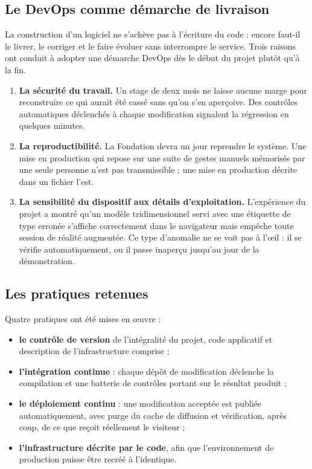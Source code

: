 \subsection{Le DevOps comme démarche de livraison}

La construction d'un logiciel ne s'achève pas à l'écriture du code : encore
faut-il le livrer, le corriger et le faire évoluer sans interrompre le service.
Trois raisons ont conduit à adopter une démarche DevOps dès le début du projet
plutôt qu'à la fin.

\begin{enumerate}
  \item \textbf{La sécurité du travail.} Un stage de deux mois ne laisse aucune
        marge pour reconstruire ce qui aurait été cassé sans qu'on s'en
        aperçoive. Des contrôles automatiques déclenchés à chaque modification
        signalent la régression en quelques minutes.

  \item \textbf{La reproductibilité.} La Fondation devra un jour reprendre le
        système. Une mise en production qui repose sur une suite de gestes
        manuels mémorisés par une seule personne n'est pas transmissible ; une
        mise en production décrite dans un fichier l'est.

  \item \textbf{La sensibilité du dispositif aux détails d'exploitation.}
        L'expérience du projet a montré qu'un modèle tridimensionnel servi avec
        une étiquette de type erronée s'affiche correctement dans le navigateur
        mais empêche toute session de réalité augmentée. Ce type d'anomalie ne
        se voit pas à l'œil : il se vérifie automatiquement, ou il passe
        inaperçu jusqu'au jour de la démonstration.
\end{enumerate}

\subsection{Les pratiques retenues}

Quatre pratiques ont été mises en œuvre :

\begin{itemize}
  \item \textbf{le contrôle de version} de l'intégralité du projet, code
        applicatif et description de l'infrastructure comprise ;
  \item \textbf{l'intégration continue} : chaque dépôt de modification déclenche
        la compilation et une batterie de contrôles portant sur le résultat
        produit ;
  \item \textbf{le déploiement continu} : une modification acceptée est publiée
        automatiquement, avec purge du cache de diffusion et vérification, après
        coup, de ce que reçoit réellement le visiteur ;
  \item \textbf{l'infrastructure décrite par le code}, afin que l'environnement
        de production puisse être recréé à l'identique.
\end{itemize}

